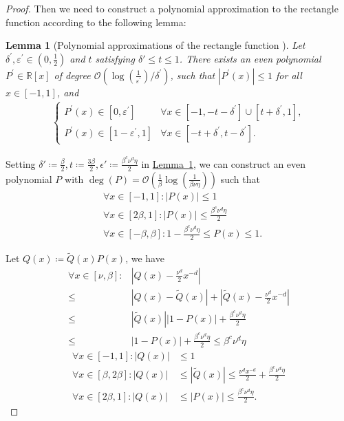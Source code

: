 \documentclass[journal]{IEEEtran}
\newtheorem{lemma}{Lemma}
\newcommand{\lem}[1]{\hyperref[lem:#1]{Lemma~\ref*{lem:#1}}}
\begin{document}
\begin{proof}
Then we need to construct a polynomial approximation to the rectangle function according to the following lemma:
\begin{lemma}[Polynomial approximations of the rectangle function {\cite[Lemma 29]{gilyen2019singular}}]\label{lem:rectangle_approximation}
  Let $\delta^{\prime}, \varepsilon^{\prime} \in\left(0, \frac{1}{2}\right)$ and $t$ satisfying $\delta' \le t \le 1$. There exists an even polynomial $P^{\prime} \in \mathbb{R}[x]$ of degree $\mathcal{O}\left(\log \left(\frac{1}{\varepsilon^{\prime}}\right) / \delta^{\prime}\right)$, such that $\left|P^{\prime}(x)\right| \leq 1$ for all $x \in[-1,1]$, and
  \begin{align}
    \begin{cases}P^{\prime}(x) \in \left[0, \varepsilon^{\prime}\right] & \forall x \in\left[-1,-t-\delta^{\prime}\right] \cup\left[t+\delta^{\prime}, 1\right], \\ P^{\prime}(x) \in\left[1-\varepsilon^{\prime}, 1\right] & \forall x \in\left[-t+\delta^{\prime}, t-\delta^{\prime}\right].\end{cases}
  \end{align}
\end{lemma}

  Setting $\delta'\coloneqq \frac{\beta}{2}, t \coloneqq \frac{3\beta}{2}, \epsilon' \coloneqq{\frac{\beta^{c}\nu^{d}\eta}{2}}$ in \lem{rectangle_approximation}, we can construct an even polynomial $P$ with $\deg(P) = \mathcal{O}\left(\frac{1}{\beta}\log(\frac{1}{\beta\nu\eta})\right)$ such that
  \begin{align}
       & \forall x \in[-1,1]: |P(x)| \le 1                                            \nonumber \\
       & \forall x \in [2\beta,1]:|P(x)| \le \frac{\beta^{c}\nu^{d}\eta}{2}           \nonumber \\
       & \forall x \in [-\beta,\beta]:1-\frac{\beta^{c}\nu^{d}\eta}{2} \le P(x) \le 1. 
  \end{align}
      
  Let $Q(x) \coloneqq \tilde{Q}(x)P(x)$, we have
  \begin{align}
    \forall x \in[\nu,\beta]: &|Q(x)-\frac{\nu^{d}}{2}x^{-d}| \nonumber\\ \le& |Q(x)-\tilde{Q}(x)|+|\tilde{Q}(x)-\frac{\nu^{d}}{2}x^{-d}|\nonumber\\
    \le& |\tilde{Q}(x)||1-P(x)| + \frac{\beta^c\nu^d\eta}{2}\nonumber\\
    \le&|1-P(x)|+\frac{\beta^c\nu^d\eta}{2} \le \beta^{c}\nu^{d}\eta \nonumber
  \end{align}
  \begin{align}
      \label{eq:small_value_eqn1}
      \forall x \in[-1,1]: |Q(x)| & \le 1\nonumber\\
      \forall x \in [\beta,2\beta]: |Q(x)|
      & \le |\tilde{Q}(x)| \le \frac{\nu^dx^{-d}}{2}+\frac{\beta^c\nu^d\eta}{2} \nonumber\\
      \forall x \in [2\beta,1]: |Q(x)|                         & \le |P(x)|\le \frac{\beta^c\nu^d\eta}{2}.
  \end{align}


\end{proof}
\end{document}
